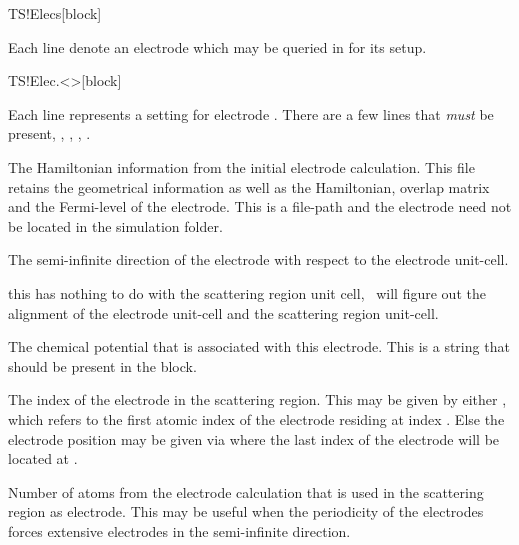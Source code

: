 \begin{fdfentry}{TS!Elecs}[block]

  Each line denote an electrode which may be queried in
   for its setup.
  
\end{fdfentry}

\begin{fdfentry}{TS!Elec.<>}[block]

  Each line represents a setting for electrode \fdf*{<>}.
  There are a few lines that \emph{must} be present, ,
  , , .

  \begin{fdfoptions}

    \option[HS]%
    The Hamiltonian information from the initial electrode
    calculation. This file retains the geometrical information as well
    as the Hamiltonian, overlap matrix and the Fermi-level of the
    electrode. 
    This is a file-path and the electrode  need not be
    located in the simulation folder.

    The semi-infinite direction of the electrode with respect to the
    electrode unit-cell. 

    \note this has nothing to do with the scattering region unit cell,
    \tsiesta\ will figure out the alignment of the electrode unit-cell
    and the scattering region unit-cell.

    The chemical potential that is associated with this
    electrode. This is a string that should be present in the
     block.

    The index of the electrode in the scattering region.
    This may be given by either , which refers to
    the first atomic index of the electrode residing at index
    . Else the electrode position may be given via
     where the last index of the electrode
    will be located at .

    Number of atoms from the electrode calculation that is used in the
    scattering region as electrode. This may be useful when the
    periodicity of the electrodes forces extensive electrodes in the
    semi-infinite direction.


\end{fdfoptions}
\end{fdfentry}
